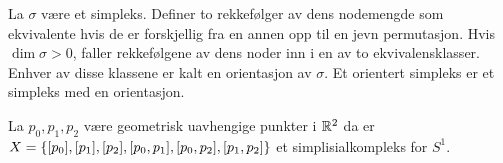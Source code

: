 \begin{definisjon}\label{def:Orientering}
  La $\sigma$ være et simpleks. Definer to rekkefølger av dens
  nodemengde som ekvivalente hvis de er forskjellig fra en annen
  opp til en jevn permutasjon. Hvis $\dim\sigma>0$, faller
  rekkefølgene av dens noder inn i en av to ekvivalensklasser.
  Enhver av disse klassene er kalt en orientasjon av $\sigma$. Et
  orientert simpleks er et simpleks med en orientasjon.
\end{definisjon}

\begin{eksempel}\label{eks:Sirkel}
  La $p_0,p_1,p_2$ være geometrisk uavhengige punkter
  i $\mathbb{R}^2$ da er $X
  = \left\{[p_0],[p_1],[p_2],[p_0,p_1],[p_0,p_2],[p_1,p_2]\right\}$ et
  simplisialkompleks for $S^1$.
\end{eksempel}




